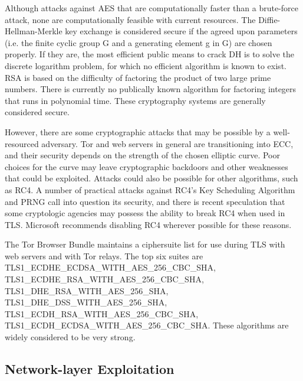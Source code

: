 \documentclass[journal]{IEEEtran}
\begin{document}
Although attacks against AES that are computationally faster than a brute-force attack, none are computationally feasible with current resources. The Diffie-Hellman-Merkle key exchange is considered secure if the agreed upon parameters (i.e. the finite cyclic group G and a generating element g in G) are chosen properly. If they are, the most efficient public means to crack DH is to solve the discrete logarithm problem, for which no efficient algorithm is known to exist. RSA is based on the difficulty of factoring the product of two large prime numbers. There is currently no publically known algorithm for factoring integers that runs in polynomial time. These cryptography systems are generally considered secure.

However, there are some cryptographic attacks that may be possible by a well-resourced adversary. Tor and web servers in general are transitioning into ECC, and their security depends on the strength of the chosen elliptic curve. Poor choices for the curve may leave cryptographic backdoors and other weaknesses that could be exploited. Attacks could also be possible for other algorithms, such as RC4. A number of practical attacks against RC4's Key Scheduling Algorithm and PRNG call into question its security, and there is recent speculation that some cryptologic agencies may possess the ability to break RC4 when used in TLS. Microsoft recommends disabling RC4 wherever possible for these reasons.

The Tor Browser Bundle maintains a ciphersuite list for use during TLS with web servers and with Tor relays. The top six suites are TLS1\_ECDHE\_ECDSA\_WITH\_AES\_256\_CBC\_SHA, TLS1\_ECDHE\_RSA\_WITH\_AES\_256\_CBC\_SHA, TLS1\_DHE\_RSA\_WITH\_AES\_256\_SHA, TLS1\_DHE\_DSS\_WITH\_AES\_256\_SHA, TLS1\_ECDH\_RSA\_WITH\_AES\_256\_CBC\_SHA, TLS1\_ECDH\_ECDSA\_WITH\_AES\_256\_CBC\_SHA. These algorithms are widely considered to be very strong.

\subsection{Network-layer Exploitation}
\end{document}
